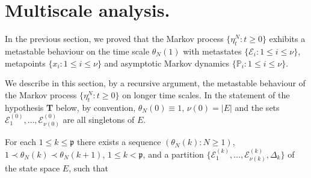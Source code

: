 \documentclass[reqno]{amsart}
\begin{document}
\section{Multiscale analysis.}
\label{ssec3}

In the previous section, we proved that the Markov process $\{\eta^N_t
: t\ge 0\}$ exhibits a metastable behaviour on the time scale
$\theta_N(1)$ with metastates $\{{{\mathcal E}}_i : 1\le i\le \nu\}$,
metapoints $\{x_i : 1\le i\le \nu\}$ and asymptotic Markov dynamics
$\{{{\mathbb P}}_i : 1\le i\le \nu\}$.

We describe in this section, by a recursive argument, the metastable
behaviour of the Markov process $\{\eta^N_t : t\ge 0\}$ on longer time
scales. In the statement of the hypothesis {\bf T} below, by
convention, $\theta_N(0) \equiv 1$, $\nu(0) = |E|$ and the sets ${{\mathcal E}}^{(0)}_1, \dots, {{\mathcal E}}^{(0)}_{\nu(0)}$ are all singletons of $E$.

\smallskip
{}\;\; For each
$1\le k\le {{\mathfrak p}}$ there exists a sequence $(\theta_N(k) : N\ge 1)$,
$1\prec \theta_N(k) \prec \theta_N(k+1)$, $1\le k <{{\mathfrak p}}$, and a
partition $\{{{\mathcal E}}^{(k)}_1 , \dots, {{\mathcal E}}^{(k)}_{\nu(k)}, \Delta_k\}$
of the state space $E$, such that
\end{document}
